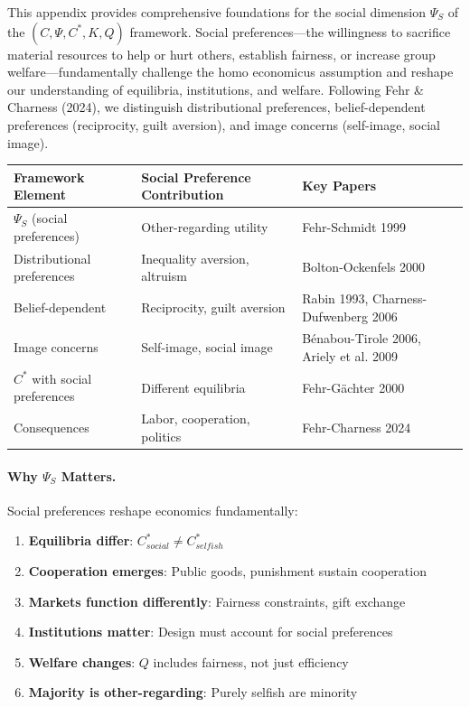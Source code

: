 This appendix provides comprehensive foundations for the social dimension 
$\Psi_S$ of the $(C, \Psi, C^*, K, Q)$ framework. Social preferences---the 
willingness to sacrifice material resources to help or hurt others, establish 
fairness, or increase group welfare---fundamentally challenge the homo economicus 
assumption and reshape our understanding of equilibria, institutions, and 
welfare. Following Fehr \& Charness (2024), we distinguish distributional 
preferences, belief-dependent preferences (reciprocity, guilt aversion), and 
image concerns (self-image, social image).

\begin{center}
\renewcommand{\arraystretch}{1.4}
\begin{tabular}{|l|l|l|}
\hline
\textbf{Framework Element} & \textbf{Social Preference Contribution} & \textbf{Key Papers} \\
\hline
$\Psi_S$ (social preferences) & Other-regarding utility & Fehr-Schmidt 1999 \\
Distributional preferences & Inequality aversion, altruism & Bolton-Ockenfels 2000 \\
Belief-dependent & Reciprocity, guilt aversion & Rabin 1993, Charness-Dufwenberg 2006 \\
Image concerns & Self-image, social image & Bénabou-Tirole 2006, Ariely et al. 2009 \\
$C^*$ with social preferences & Different equilibria & Fehr-Gächter 2000 \\
Consequences & Labor, cooperation, politics & Fehr-Charness 2024 \\
\hline
\end{tabular}
\end{center}

\paragraph{Why $\Psi_S$ Matters.}
Social preferences reshape economics fundamentally:
\begin{enumerate}
    \item \textbf{Equilibria differ}: $C^*_{social} \neq C^*_{selfish}$
    \item \textbf{Cooperation emerges}: Public goods, punishment sustain cooperation
    \item \textbf{Markets function differently}: Fairness constraints, gift exchange
    \item \textbf{Institutions matter}: Design must account for social preferences
    \item \textbf{Welfare changes}: $Q$ includes fairness, not just efficiency
    \item \textbf{Majority is other-regarding}: Purely selfish are minority
\end{enumerate}

